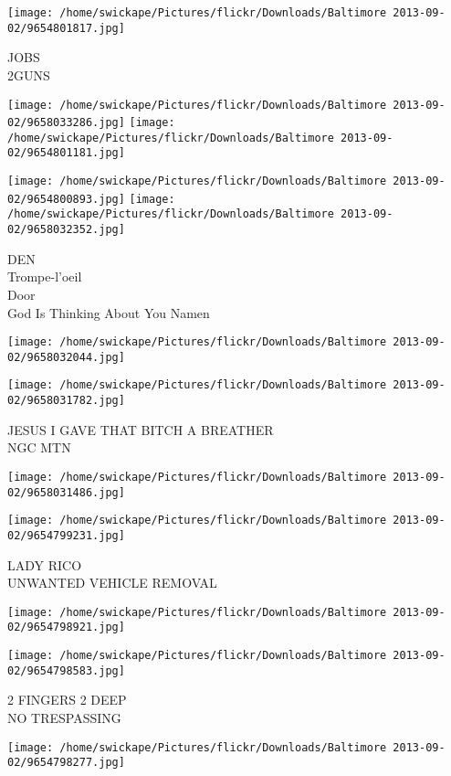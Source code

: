 \documentclass[10pt,letterpaper]{article}
\begin{document}
\vspace{0.25in}
\texttt{[image: /home/swickape/Pictures/flickr/Downloads/Baltimore 2013-09-02/9654801817.jpg]}

JOBS\\
2GUNS
\pagebreak

\texttt{[image: /home/swickape/Pictures/flickr/Downloads/Baltimore 2013-09-02/9658033286.jpg]}
\texttt{[image: /home/swickape/Pictures/flickr/Downloads/Baltimore 2013-09-02/9654801181.jpg]}

\texttt{[image: /home/swickape/Pictures/flickr/Downloads/Baltimore 2013-09-02/9654800893.jpg]}
\texttt{[image: /home/swickape/Pictures/flickr/Downloads/Baltimore 2013-09-02/9658032352.jpg]}

DEN\\
Trompe{-}l'oeil\\
Door\\
God Is Thinking About You Namen
\pagebreak

\texttt{[image: /home/swickape/Pictures/flickr/Downloads/Baltimore 2013-09-02/9658032044.jpg]}

\vspace{0.25in}
\texttt{[image: /home/swickape/Pictures/flickr/Downloads/Baltimore 2013-09-02/9658031782.jpg]}

JESUS I GAVE THAT BITCH A BREATHER\\
NGC MTN
\pagebreak

\texttt{[image: /home/swickape/Pictures/flickr/Downloads/Baltimore 2013-09-02/9658031486.jpg]}

\vspace{0.25in}
\texttt{[image: /home/swickape/Pictures/flickr/Downloads/Baltimore 2013-09-02/9654799231.jpg]}

LADY RICO\\
UNWANTED VEHICLE REMOVAL
\pagebreak

\texttt{[image: /home/swickape/Pictures/flickr/Downloads/Baltimore 2013-09-02/9654798921.jpg]}

\vspace{0.25in}
\texttt{[image: /home/swickape/Pictures/flickr/Downloads/Baltimore 2013-09-02/9654798583.jpg]}

2 FINGERS 2 DEEP\\
NO TRESPASSING
\pagebreak

\texttt{[image: /home/swickape/Pictures/flickr/Downloads/Baltimore 2013-09-02/9654798277.jpg]}
\end{document}
